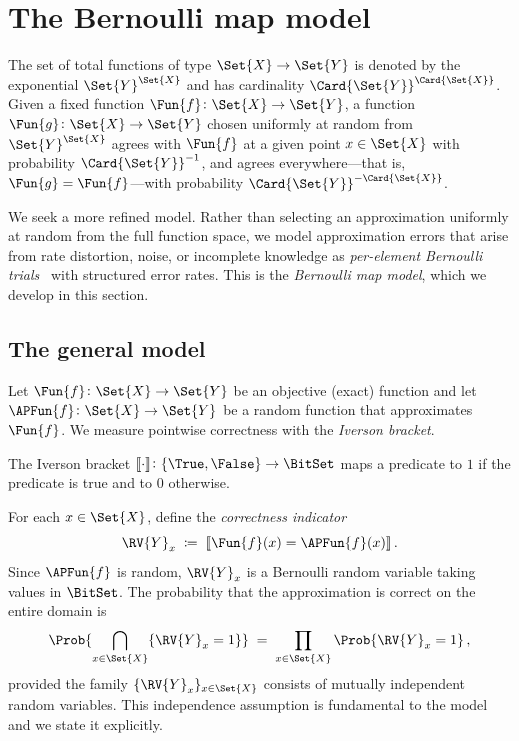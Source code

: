 \documentclass[ ../main.tex]{subfiles}
\begin{document}
\section{The Bernoulli map model}
\label{sec:bernoulli-map}

The set of total functions of type $\Set{X} \to \Set{Y}$ is denoted by the
exponential $\Set{Y}^{\Set{X}}$ and has cardinality
$\Card{\Set{Y}}^{\Card{\Set{X}}}$.
Given a fixed function $\Fun{f} \colon \Set{X} \to \Set{Y}$, a function
$\Fun{g} \colon \Set{X} \to \Set{Y}$ chosen uniformly at random from
$\Set{Y}^{\Set{X}}$ agrees with $\Fun{f}$ at a given point $x \in \Set{X}$
with probability $\Card{\Set{Y}}^{-1}$, and agrees everywhere---that is,
$\Fun{g} = \Fun{f}$---with probability $\Card{\Set{Y}}^{-\Card{\Set{X}}}$.

We seek a more refined model.
Rather than selecting an approximation uniformly at random from the full
function space, we model approximation errors that arise from rate distortion,
noise, or incomplete knowledge as \emph{per-element Bernoulli trials}~\cite{feller1968} with
structured error rates.
This is the \emph{Bernoulli map model}, which we develop in this section.

\subsection{The general model}
\label{sec:general_model}

Let $\Fun{f} \colon \Set{X} \to \Set{Y}$ be an objective (exact) function and
let $\APFun{f} \colon \Set{X} \to \Set{Y}$ be a random function that
approximates $\Fun{f}$.
We measure pointwise correctness with the \emph{Iverson bracket}.

\begin{definition}
\label{def:iverson}
The Iverson bracket $\llbracket \cdot \rrbracket \colon \{\True, \False\} \to
\BitSet$ maps a predicate to $1$ if the predicate is true and to $0$ otherwise.
\end{definition}

For each $x \in \Set{X}$, define the \emph{correctness indicator}
\begin{equation}
\label{eq:correctness}
    \RV{Y}_x \;\coloneqq\; \llbracket \Fun{f}(x) = \APFun{f}(x) \rrbracket\,.
\end{equation}
Since $\APFun{f}$ is random, $\RV{Y}_x$ is a Bernoulli random variable taking
values in $\BitSet$.
The probability that the approximation is correct on the entire domain is
\begin{equation}
\label{eq:joint_correct}
    \Prob{\bigcap_{x \in \Set{X}} \{\RV{Y}_x = 1\}}
    \;=\; \prod_{x \in \Set{X}} \Prob{\RV{Y}_x = 1}\,,
\end{equation}
provided the family $\{\RV{Y}_x\}_{x \in \Set{X}}$ consists of mutually
independent random variables.
This independence assumption is fundamental to the model and we state it
explicitly.
\end{document}
